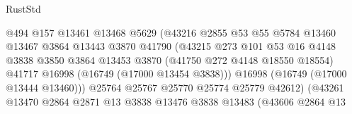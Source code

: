 \begin{lexlean}{RustStd}
\begin{coremodule}
                                          @494
                                          @157
                                          @13461
                                          @13468
                                          @5629
                                          (@43216
                                            @2855
                                            @53
                                            @55
                                            @5784
                                            @13460
                                            @13467
                                            @3864
                                            @13443
                                            @3870
                                            @41790
                                            (@43215
                                              @273
                                              @101
                                              @53
                                              @16
                                              @4148
                                              @3838
                                              @3850
                                              @3864
                                              @13453
                                              @3870
                                              (@41750 @272 @4148 @18550 @18554)
                                              @41717
                                              @16998
                                              (@16749 (@17000 @13454 @3838)))
                                            @16998
                                            (@16749 (@17000 @13444 @13460)))
                                          @25764
                                          @25767
                                          @25770
                                          @25774
                                          @25779
                                          @42612)
                                        (@43261
                                          @13470
                                          @2864
                                          @2871
                                          @13
                                          @3838
                                          @13476
                                          @3838
                                          @13483
                                          (@43606
                                            @2864
                                            @13

\end{coremodule}
\end{lexlean}
